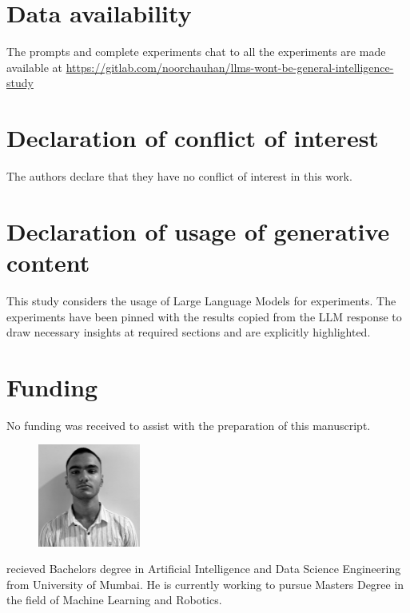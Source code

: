 \documentclass[pdflatex,sn-mathphys-num]{sn-jnl}%
\theoremstyle{thmstyleone}%
\theoremstyle{thmstyletwo}%
\theoremstyle{thmstylethree}%
\begin{document}
\section*{Data availability}
The prompts and complete experiments chat to all the experiments are made available at \href{https://gitlab.com/noorchauhan/llms-wont-be-general-intelligence-study}{https://gitlab.com/noorchauhan/llms-wont-be-general-intelligence-study}

\section*{Declaration of conflict of interest}
The authors declare that they have no conflict of interest in this work.

\section*{Declaration of usage of generative content}
This study considers the usage of Large Language Models for experiments. The experiments have been pinned with the results copied from the LLM response to draw necessary insights at required sections and are explicitly highlighted.

\section*{Funding}
No funding was received to assist with the preparation of this manuscript.



\begin{figure}[H]%
\centering
\includegraphics[width=0.3\textwidth]{figures/Noor.eps}
\end{figure}

 recieved Bachelors degree in Artificial Intelligence and Data Science Engineering from University of Mumbai. He is currently working to pursue Masters Degree in the field of Machine Learning and Robotics.
\end{document}
